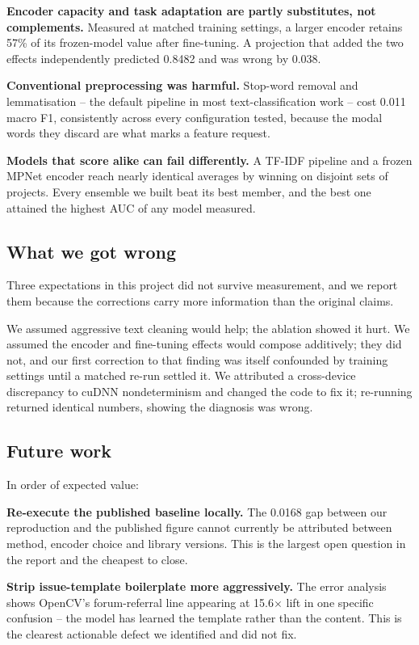 \textbf{Encoder capacity and task adaptation are partly substitutes, not complements.} Measured at matched training settings, a larger encoder retains 57\% of its frozen-model value after fine-tuning. A projection that added the two effects independently predicted 0.8482 and was wrong by 0.038.

\textbf{Conventional preprocessing was harmful.} Stop-word removal and lemmatisation -- the default pipeline in most text-classification work -- cost 0.011 macro F1, consistently across every configuration tested, because the modal words they discard are what marks a feature request.

\textbf{Models that score alike can fail differently.} A TF-IDF pipeline and a frozen MPNet encoder reach nearly identical averages by winning on disjoint sets of projects. Every ensemble we built beat its best member, and the best one attained the highest AUC of any model measured.

\subsection{What we got wrong}

Three expectations in this project did not survive measurement, and we report them because the corrections carry more information than the original claims.

We assumed aggressive text cleaning would help; the ablation showed it hurt. We assumed the encoder and fine-tuning effects would compose additively; they did not, and our first correction to that finding was itself confounded by training settings until a matched re-run settled it. We attributed a cross-device discrepancy to cuDNN nondeterminism and changed the code to fix it; re-running returned identical numbers, showing the diagnosis was wrong.

\subsection{Future work}

In order of expected value:

\textbf{Re-execute the published baseline locally.} The 0.0168 gap between our reproduction and the published figure cannot currently be attributed between method, encoder choice and library versions. This is the largest open question in the report and the cheapest to close.

\textbf{Strip issue-template boilerplate more aggressively.} The error analysis shows OpenCV's forum-referral line appearing at 15.6$\times$ lift in one specific confusion -- the model has learned the template rather than the content. This is the clearest actionable defect we identified and did not fix.

